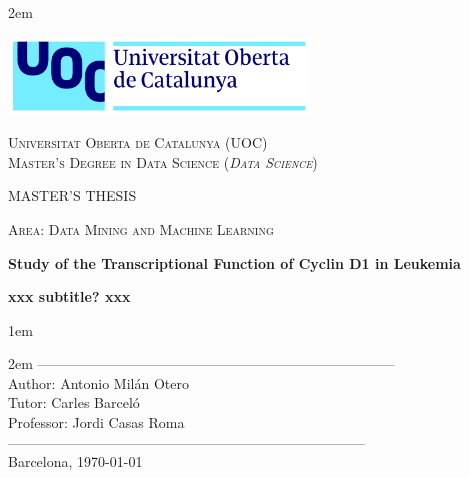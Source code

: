 \newpage
\thispagestyle{empty}

\baselineskip 2em


\centerline{\includegraphics[width=0.6\textwidth]{images/UOC-logo}}
\begin{center}
\textsc{Universitat Oberta de Catalunya (UOC) \\
 Master's Degree in Data Science (\textit{Data Science})\\}


\vspace*{1.5cm}

\textsc{\Large MASTER'S THESIS}

\vspace*{0.5cm}

\textsc{\large Area: Data Mining and Machine Learning}



\vspace*{2.0cm}

\textbf{\Large Study of the Transcriptional Function of Cyclin D1 in Leukemia}

\textbf{\large xxx subtitle? xxx}

\vspace{2.5cm}
\baselineskip 1em

\baselineskip 2em
-----------------------------------------------------------------------------\\
Author:     Antonio Milán Otero\\
Tutor:      Carles Barceló\\
Professor:  Jordi Casas Roma\\
-----------------------------------------------------------------------------\\
\vspace*{1.5cm}
Barcelona, \today

\end{center}

\newpage
\pagestyle{empty}
\hfill
